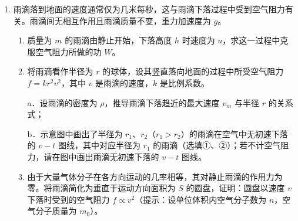 \documentclass[\gkver]{gaokaozhenti}
\begin{document}
\begin{enumerate}
\item
雨滴落到地面的速度通常仅为几米每秒，这与雨滴下落过程中受到空气阻力有关。雨滴间无相互作用且雨滴质量不变，重力加速度为 $g$。

\begin{enumerate}
	\item
	质量为 $m$ 的雨滴由静止开始，下落高度 $h$ 时速度为 $u$，求这一过程中克服空气阻力所做的功 $W$。

	\item
	将雨滴看作半径为 $r$ 的球体，设其竖直落向地面的过程中所受空气阻力 $f=kr^2v^2$，其中 $v$ 是雨滴的速度，$k$ 是比例系数。

	a．设雨滴的密度为 $\rho$，推导雨滴下落趋近的最大速度 $v_m$ 与半径 $r$ 的关系式；

	b．示意图中画出了半径为 $r_1$、$r_2$（$r_1>r_2$）的雨滴在空气中无初速下落的 $v-t$ 图线，其中对应半径为 $r_1$ 的雨滴（选填①、②）；若不计空气阻力，请在图中画出雨滴无初速下落的 $v-t$ 图线。

	\item
	由于大量气体分子在各方向运动的几率相等，其对静止雨滴的作用力为零。将雨滴简化为垂直于运动方向面积为 $S$ 的圆盘，证明：圆盘以速度 $v$ 下落时受到的空气阻力 $f\propto v^2$（提示：设单位体积内空气分子数为 $n$，空气分子质量为 $m_0$）。
\end{enumerate}

\onepicture[align=right, w=3.90cm]{}

\end{enumerate}
\end{document}
